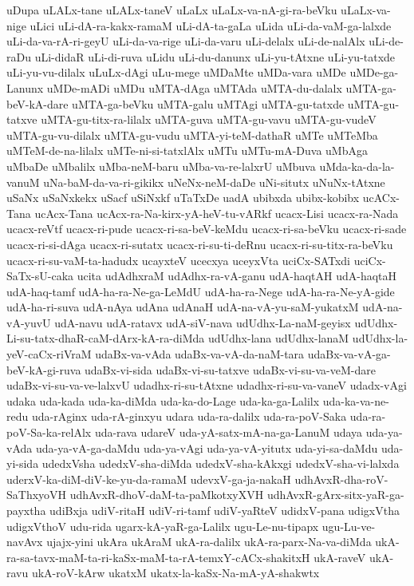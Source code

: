 {uDupa
uLALx-tane
uLALx-taneV
uLaLx
uLaLx-va-nA-gi-ra-beVku
uLaLx-va-nige
uLici
uLi-dA-ra-kakx-ramaM
uLi-dA-ta-gaLa
uLida
uLi-da-vaM-ga-lalxde
uLi-da-va-rA-ri-geyU
uLi-da-va-rige
uLi-da-varu
uLi-delalx
uLi-de-nalAlx
uLi-de-raDu
uLi-didaR
uLi-di-ruva
uLidu
uLi-du-danunx
uLi-yu-tAtxne
uLi-yu-tatxde
uLi-yu-vu-dilalx
uLuLx-dAgi
uLu-mege
uMDaMte
uMDa-vara
uMDe
uMDe-ga-Lanunx
uMDe-mADi
uMDu
uMTA-dAga
uMTAda
uMTA-du-dalalx
uMTA-ga-beV-kA-dare
uMTA-ga-beVku
uMTA-galu
uMTAgi
uMTA-gu-tatxde
uMTA-gu-tatxve
uMTA-gu-titx-ra-lilalx
uMTA-guva
uMTA-gu-vavu
uMTA-gu-vudeV
uMTA-gu-vu-dilalx
uMTA-gu-vudu
uMTA-yi-teM-dathaR
uMTe
uMTeMba
uMTeM-de-na-lilalx
uMTe-ni-si-tatxlAlx
uMTu
uMTu-mA-Duva
uMbAga
uMbaDe
uMbalilx
uMba-neM-baru
uMba-va-re-lalxrU
uMbuva
uMda-ka-da-la-vanuM
uNa-baM-da-va-ri-gikikx
uNeNx-neM-daDe
uNi-situtx
uNuNx-tAtxne
uSaNx
uSaNxkekx
uSacf
uSiNxkf
uTaTxDe
uadA
ubibxda
ubibx-kobibx
ucACx-Tana
ucAcx-Tana
ucAcx-ra-Na-kirx-yA-heV-tu-vARkf
ucacx-Lisi
ucacx-ra-Nada
ucacx-reVtf
ucacx-ri-pude
ucacx-ri-sa-beV-keMdu
ucacx-ri-sa-beVku
ucacx-ri-sade
ucacx-ri-si-dAga
ucacx-ri-sutatx
ucacx-ri-su-ti-deRnu
ucacx-ri-su-titx-ra-beVku
ucacx-ri-su-vaM-ta-hadudx
ucayxteV
ucecxya
uceyxVta
uciCx-SATxdi
uciCx-SaTx-sU-caka
ucita
udAdhxraM
udAdhx-ra-vA-ganu
udA-haqtAH
udA-haqtaH
udA-haq-tamf
udA-ha-ra-Ne-ga-LeMdU
udA-ha-ra-Nege
udA-ha-ra-Ne-yA-gide
udA-ha-ri-suva
udA-nAya
udAna
udAnaH
udA-na-vA-yu-saM-yukatxM
udA-na-vA-yuvU
udA-navu
udA-ratavx
udA-siV-nava
udUdhx-La-naM-geyisx
udUdhx-Li-su-tatx-dhaR-caM-dArx-kA-ra-diMda
udUdhx-lana
udUdhx-lanaM
udUdhx-la-yeV-caCx-riVraM
udaBx-va-vAda
udaBx-va-vA-da-naM-tara
udaBx-va-vA-ga-beV-kA-gi-ruva
udaBx-vi-sida
udaBx-vi-su-tatxve
udaBx-vi-su-va-veM-dare
udaBx-vi-su-va-ve-lalxvU
udadhx-ri-su-tAtxne
udadhx-ri-su-va-vaneV
udadx-vAgi
udaka
uda-kada
uda-ka-diMda
uda-ka-do-Lage
uda-ka-ga-Lalilx
uda-ka-va-ne-redu
uda-rAginx
uda-rA-ginxyu
udara
uda-ra-dalilx
uda-ra-poV-Saka
uda-ra-poV-Sa-ka-relAlx
uda-rava
udareV
uda-yA-satx-mA-na-ga-LanuM
udaya
uda-ya-vAda
uda-ya-vA-ga-daMdu
uda-ya-vAgi
uda-ya-vA-yitutx
uda-yi-sa-daMdu
uda-yi-sida
udedxVsha
udedxV-sha-diMda
udedxV-sha-kAkxgi
udedxV-sha-vi-lalxda
uderxV-ka-diM-diV-ke-yu-da-ramaM
udevxV-ga-ja-nakaH
udhAvxR-dha-roV-SaThxyoVH
udhAvxR-dhoV-daM-ta-paMkotxyXVH
udhAvxR-gArx-sitx-yaR-ga-payxtha
udiBxja
udiV-ritaH
udiV-ri-tamf
udiV-yaRteV
udidxV-pana
udigxVtha
udigxVthoV
udu-rida
ugarx-kA-yaR-ga-Lalilx
ugu-Le-nu-tipapx
ugu-Lu-ve-navAvx
ujajx-yini
ukAra
ukAraM
ukA-ra-dalilx
ukA-ra-parx-Na-va-diMda
ukA-ra-sa-tavx-maM-ta-ri-kaSx-maM-ta-rA-temxY-cACx-shakitxH
ukA-raveV
ukA-ravu
ukA-roV-kArw
ukatxM
ukatx-la-kaSx-Na-mA-yA-shakwtx
}
